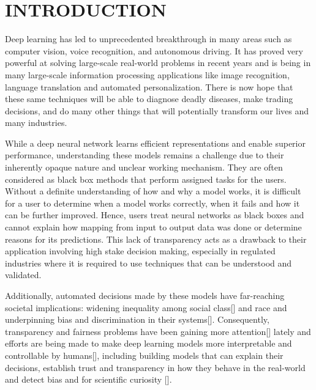 %
%
\chapter{INTRODUCTION}
\thispagestyle{empty}


Deep learning has led to unprecedented breakthrough in many areas such as computer vision, voice recognition, and autonomous driving.  It has proved very powerful at solving large-scale real-world problems in recent years and is being in many large-scale information processing applications like image recognition, language translation and automated personalization. There is now hope that these same techniques will be able to diagnose deadly diseases,  make trading decisions, and do many other things that will potentially transform our lives and many industries. 

While a deep neural network learns efficient representations and enable superior performance, understanding these models remains a challenge due to their inherently opaque nature and unclear working mechanism. They are often considered as black box methods that perform assigned tasks for the users. Without a definite understanding of how and why a model works, it is difficult for a user to determine when a model works correctly, when it fails and how it can be further improved. Hence, users treat neural networks as black boxes and cannot explain how mapping from input to output data was done or determine reasons for its predictions. This lack of transparency acts as a drawback to their application involving high stake decision making, especially in regulated industries where it is required to use techniques that can be understood and validated.

Additionally, automated decisions made by these models have far-reaching societal implications: widening inequality among social class[] and race and underpinning bias and discrimination in their systems[]. Consequently, transparency and fairness problems have been gaining more attention[] lately and efforts are being made to make deep learning models more interpretable and controllable by humans[], including building models that can explain their decisions, establish trust and transparency in how they behave in the real-world and detect bias and for scientific curiosity [].

